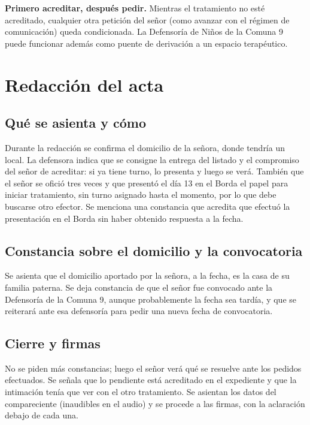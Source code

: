 \documentclass[12pt,oneside]{book}
\begin{document}
\begin{important}
\textbf{Primero acreditar, despu\'es pedir.} Mientras el tratamiento no est\'e acreditado, cualquier otra petici\'on del se\~nor (como avanzar con el r\'egimen de comunicaci\'on) queda condicionada. La Defensor\'ia de Ni\~nos de la Comuna 9 puede funcionar adem\'as como puente de derivaci\'on a un espacio terap\'eutico.
\end{important}

\section{Redacci\'on del acta}

\subsection{Qu\'e se asienta y c\'omo}

Durante la redacci\'on se confirma el domicilio de la se\~nora, donde tendr\'ia un local. La defensora indica que se consigne la entrega del listado y el compromiso del se\~nor de acreditar: si ya tiene turno, lo presenta y luego se ver\'a. Tambi\'en que el se\~nor se ofici\'o tres veces y que present\'o el d\'ia 13 en el Borda el papel para iniciar tratamiento, sin turno asignado hasta el momento, por lo que debe buscarse otro efector. Se menciona una constancia que acredita que efectu\'o la presentaci\'on en el Borda sin haber obtenido respuesta a la fecha.

\subsection{Constancia sobre el domicilio y la convocatoria}

Se asienta que el domicilio aportado por la se\~nora, a la fecha, es la casa de su familia paterna. %
Se deja constancia de que el se\~nor fue convocado ante la Defensor\'ia de la Comuna 9, aunque probablemente la fecha sea tard\'ia, y que se reiterar\'a ante esa defensor\'ia para pedir una nueva fecha de convocatoria.

\subsection{Cierre y firmas}

No se piden m\'as constancias; luego el se\~nor ver\'a qu\'e se resuelve ante los pedidos efectuados. Se se\~nala que lo pendiente est\'a acreditado en el expediente y que la intimaci\'on ten\'ia que ver con el otro tratamiento. Se asientan los datos del compareciente (inaudibles en el audio) y se procede a las firmas, con la aclaraci\'on debajo de cada una.
\end{document}
